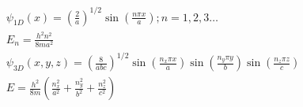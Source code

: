 \begin{align*}
&\psi_{1D}\left(x\right) = \left(\frac{2}{a}\right)^{1/2}\sin \left(\frac{n\pi x}{a} \right); n = 1, 2, 3 \ldots\\
&E_n=\frac{h^2n^2}{8ma^2}\\
&\psi_{3D}\left(x,y,z\right) = \left( \frac{8}{abc}\right)^{1/2}\sin \left(\frac{n_x\pi x}{a} \right) \sin \left(\frac{n_y\pi y}{b} \right) \sin \left(\frac{n_z\pi z}{c} \right)\\
&E=\frac{h^2}{8m}\left(\frac{n_x^2}{a^2} + \frac{n_y^2}{b^2} + \frac{n_z^2}{c^2} \right)
\end{align*}
